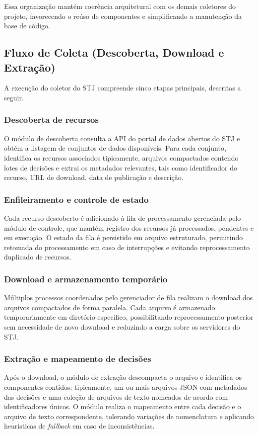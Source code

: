 Essa organização mantém coerência arquitetural com os demais coletores do projeto, favorecendo o reúso de componentes e simplificando a manutenção da base de código.

\subsection{Fluxo de Coleta (Descoberta, Download e Extração)}
A execução do coletor do STJ compreende cinco etapas principais, descritas a seguir.

\subsubsection{Descoberta de recursos}
O módulo de descoberta consulta a API do portal de dados abertos do STJ e obtém a listagem de conjuntos de dados disponíveis. Para cada conjunto, identifica os recursos associados tipicamente, arquivos compactados contendo lotes de decisões e extrai os metadados relevantes, tais como identificador do recurso, URL de download, data de publicação e descrição.

\subsubsection{Enfileiramento e controle de estado}
Cada recurso descoberto é adicionado à fila de processamento gerenciada pelo módulo de controle, que mantém registro dos recursos já processados, pendentes e em execução. O estado da fila é persistido em arquivo estruturado, permitindo retomada do processamento em caso de interrupções e evitando reprocessamento duplicado de recursos.

\subsubsection{Download e armazenamento temporário}
Múltiplos processos coordenados pelo gerenciador de fila realizam o download dos arquivos compactados de forma paralela. Cada arquivo é armazenado temporariamente em diretório específico, possibilitando reprocessamento posterior sem necessidade de novo download e reduzindo a carga sobre os servidores do STJ.

\subsubsection{Extração e mapeamento de decisões}
Após o download, o módulo de extração descompacta o arquivo e identifica os componentes contidos: tipicamente, um ou mais arquivos JSON com metadados das decisões e uma coleção de arquivos de texto nomeados de acordo com identificadores únicos. O módulo realiza o mapeamento entre cada decisão e o arquivo de texto correspondente, tolerando variações de nomenclatura e aplicando heurísticas de \textit{fallback} em caso de inconsistências.

